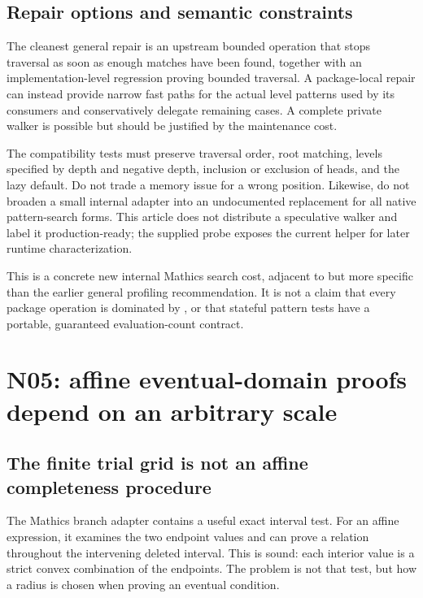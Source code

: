 \documentclass[11pt,a4paper]{article}
\newcommand{\code}[1]{\texttt{\detokenize{#1}}}
\begin{document}
\subsection{Repair options and semantic constraints}

The cleanest general repair is an upstream bounded \code{Position} operation
that stops traversal as soon as enough matches have been found, together with
an implementation-level regression proving bounded traversal. A package-local
repair can instead provide narrow fast paths for the actual level patterns
used by its consumers and conservatively delegate remaining cases. A complete
private walker is possible but should be justified by the maintenance cost.

The compatibility tests must preserve traversal order, root matching, levels
specified by depth and negative depth, inclusion or exclusion of heads, and the
lazy default. Do not trade a memory issue for a wrong position. Likewise, do
not broaden a small internal adapter into an undocumented replacement for all
native pattern-search forms. This article does not distribute a speculative
walker and label it production-ready; the supplied probe exposes the current
helper for later runtime characterization.

This is a concrete new internal Mathics search cost, adjacent to but more
specific than the earlier general profiling recommendation. It is not a claim
that every package operation is dominated by \code{FirstPosition}, or that
stateful pattern tests have a portable, guaranteed evaluation-count contract.
\cite{status,mathicscompat}

\section{N05: affine eventual-domain proofs depend on an arbitrary scale}
\label{sec:affine}

\subsection{The finite trial grid is not an affine completeness procedure}

The Mathics branch adapter contains a useful exact interval test. For an affine
expression, it examines the two endpoint values and can prove a relation
throughout the intervening deleted interval. This is sound: each interior value
is a strict convex combination of the endpoints. The problem is not that test,
but how a radius is chosen when proving an eventual condition.
\cite{mathicsbranches,mathicscallables}
\end{document}
